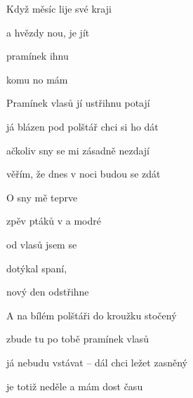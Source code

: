 

   

\zs
Když měsíc lije  své  kraji

a hvězdy nou,  je jít  

pramínek ihnu  

komu no   mám  
\ks

\zs
Pramínek vlasů jí ustřihnu potají

já blázen pod polštář chci si ho dát

ačkoliv sny se mi zásadně nezdají

věřím, že dnes v noci budou se zdát
\ks

\zr
O sny mě  teprve 

zpěv ptáků v  a modré 

od vlasů  jsem se

dotýkal  spaní,

nový den  odstřihne 
\kr

\zs
A na bílém polštáři do kroužku stočený

zbude tu po tobě pramínek vlasů

já nebudu vstávat -- dál chci ležet zasněný

je totiž neděle a mám dost času
\ks

\zr \kr

\kp


















